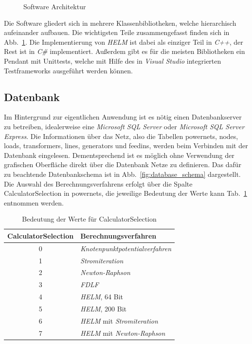 \documentclass[12pt,a4paper]{article}
\newcommand{\reffig}[1]{{Abb.~\ref{fig:#1}}}
\newcommand{\reftab}[1]{{Tab.~\ref{tab:#1}}}
\begin{document}
	\begin{figure}
		\centering
		
		\caption{Software Architektur}
		\label{fig:software_architecture}
	\end{figure}
	
	Die Software gliedert sich in mehrere Klassenbibliotheken, welche hierarchisch aufeinander aufbauen. Die wichtigsten Teile zusammengefasst finden sich in \reffig{software_architecture}. Die Implementierung von \emph{HELM} ist dabei als einziger Teil in \emph{C++}, der Rest ist in \emph{C\#} implementiert. Außerdem gibt es für die meisten Bibliotheken ein Pendant mit Unittests, welche mit Hilfe des in \emph{Visual Studio} integrierten Testframeworks ausgeführt werden können.
	
	\subsection{Datenbank}
	Im Hintergrund zur eigentlichen Anwendung ist es nötig einen Datenbankserver zu betreiben, idealerweise eine \emph{Microsoft SQL Server} oder \emph{Microsoft SQL Server Express}. Die Informationen über das Netz, also die Tabellen powernets, nodes, loads, transformers, lines, generators und feedins, werden beim Verbinden mit der Datenbank eingelesen. Dementsprechend ist es möglich ohne Verwendung der grafischen Oberfläche direkt über die Datenbank Netze zu definieren. Das dafür zu beachtende Datenbankschema ist in \reffig{database_schema} dargestellt. Die Auswahl des Berechnungsverfahrens erfolgt über die Spalte CalculatorSelection in powernets, die jeweilige Bedeutung der Werte kann \reftab{calculator_selection} entnommen werden.
	
	\begin{table}
		\centering
		\begin{tabular}{c|l}
			CalculatorSelection & Berechnungsverfahren \\ \hline
			0 & \emph{Knotenpunktpotentialverfahren} \\
	        1 & \emph{Stromiteration} \\
	        2 & \emph{Newton-Raphson} \\
	        3 & \emph{FDLF} \\
	        4 & \emph{HELM}, 64 Bit \\
	        5 & \emph{HELM}, 200 Bit \\
	        6 & \emph{HELM} mit \emph{Stromiteration} \\
	        7 & \emph{HELM} mit \emph{Newton-Raphson}
		\end{tabular}
		\caption{Bedeutung der Werte für CalculatorSelection}
		\label{tab:calculator_selection}
	\end{table}
	
\end{document}
